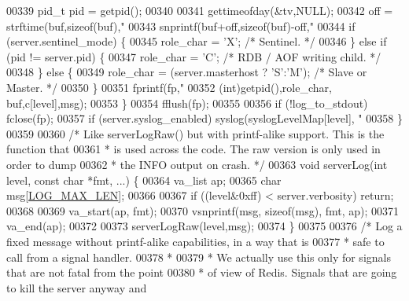 \begin{DoxyCode}
{00339         pid\_t pid = getpid();
00340 
00341         gettimeofday(&tv,NULL);
00342         off = strftime(buf,\textcolor{keyword}{sizeof}(buf),\textcolor{stringliteral}{"%
00343         snprintf(buf+off,\textcolor{keyword}{sizeof}(buf)-off,\textcolor{stringliteral}{"%
00344         \textcolor{keywordflow}{if} (server.sentinel\_mode) \{
00345             role\_char = \textcolor{stringliteral}{'X'}; \textcolor{comment}{/* Sentinel. */}
00346         \} \textcolor{keywordflow}{else} \textcolor{keywordflow}{if} (pid != server.pid) \{
00347             role\_char = \textcolor{stringliteral}{'C'}; \textcolor{comment}{/* RDB / AOF writing child. */}
00348         \} \textcolor{keywordflow}{else} \{
00349             role\_char = (server.masterhost ? \textcolor{stringliteral}{'S'}:\textcolor{stringliteral}{'M'}); \textcolor{comment}{/* Slave or Master. */}
00350         \}
00351         fprintf(fp,\textcolor{stringliteral}{"%
00352             (\textcolor{keywordtype}{int})getpid(),role\_char, buf,c[level],msg);
00353     \}
00354     fflush(fp);
00355 
00356     \textcolor{keywordflow}{if} (!log\_to\_stdout) fclose(fp);
00357     \textcolor{keywordflow}{if} (server.syslog\_enabled) syslog(syslogLevelMap[level], \textcolor{stringliteral}{"%
00358 \}
00359 
00360 \textcolor{comment}{/* Like serverLogRaw() but with printf-alike support. This is the function that}
00361 \textcolor{comment}{ * is used across the code. The raw version is only used in order to dump}
00362 \textcolor{comment}{ * the INFO output on crash. */}
00363 \textcolor{keywordtype}{void} serverLog(\textcolor{keywordtype}{int} level, \textcolor{keyword}{const} \textcolor{keywordtype}{char} *fmt, ...) \{
00364     va\_list ap;
00365     \textcolor{keywordtype}{char} msg[\hyperlink{server_8h_a37cd05cbfd7fb52ad21d3a822cff2ee6}{LOG\_MAX\_LEN}];
00366 
00367     \textcolor{keywordflow}{if} ((level&0xff) < server.verbosity) \textcolor{keywordflow}{return};
00368 
00369     va\_start(ap, fmt);
00370     vsnprintf(msg, \textcolor{keyword}{sizeof}(msg), fmt, ap);
00371     va\_end(ap);
00372 
00373     serverLogRaw(level,msg);
00374 \}
00375 
00376 \textcolor{comment}{/* Log a fixed message without printf-alike capabilities, in a way that is}
00377 \textcolor{comment}{ * safe to call from a signal handler.}
00378 \textcolor{comment}{ *}
00379 \textcolor{comment}{ * We actually use this only for signals that are not fatal from the point}
00380 \textcolor{comment}{ * of view of Redis. Signals that are going to kill the server anyway and}
}}}}}
\end{DoxyCode}
